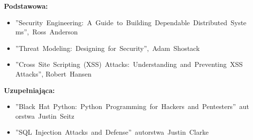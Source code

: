 \documentclass[12pt, a4paper]{article}
\begin{document}
\textbf{Podstawowa:}
\begin{itemize}
  \item ''Security Engineering: A Guide to Building Dependable Distributed Systems”, Ross Anderson
  \item ''Threat Modeling: Designing for Security'', Adam Shostack
  \item ''Cross Site Scripting (XSS) Attacks: Understanding and Preventing XSS Attacks'', Robert Hansen
\end{itemize}

\textbf{Uzupełniająca:}
\begin{itemize}
  \item ''Black Hat Python: Python Programming for Hackers and Pentesters'' autorstwa Justin Seitz
  \item ''SQL Injection Attacks and Defense'' autorstwa Justin Clarke
\end{itemize}
\end{document}
